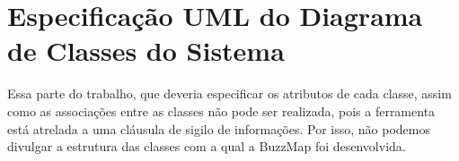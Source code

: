 \chapter{Especificação UML do Diagrama de Classes do Sistema}

Essa parte do trabalho, que deveria especificar os atributos de cada classe,
assim como as associações entre as classes não pode ser realizada, pois a
ferramenta está atrelada a uma cláusula de sigilo de informações. Por isso,
não podemos divulgar a estrutura das classes com a qual a BuzzMap foi
desenvolvida.


